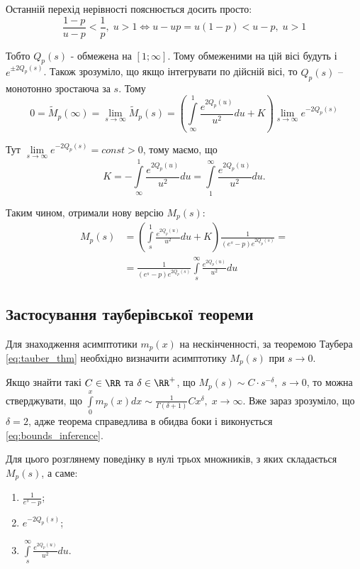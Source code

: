 Останній перехід нерівності пояснюється досить просто:
$$
\frac{1-p}{u - p} < \frac{1}{p}, \; u > 1 \Leftrightarrow u - u p = u(1-p) < u - p, \; u > 1
$$

Тобто $Q_p(s)$ - обмежена на $[1; \infty]$. Тому обмеженими на цій вісі будуть і $e^{\pm 2Q_p(s)}$. Також зрозуміло, що якщо інтегрувати по дійсній вісі, то $Q_p(s)$ – монотонно зростаюча за $s$. Тому
\begin{equation}
0 = \tilde M_p(\infty) = \lim_{s\rightarrow \infty} \tilde M_p(s) = \left( \int\limits_\infty^1 \frac{e^{2Q_p(u)}}{u^2} du + K \right) \lim_{s\rightarrow \infty} e^{- 2Q_p(s)}
\end{equation}

Тут $\lim\limits_{s\rightarrow \infty} e^{- 2Q_p(s)} = const > 0$, тому маємо, що
\begin{equation}
K = -  \int\limits_\infty^1 \frac{e^{2Q_p(u)}}{u^2} du =  \int\limits_1^\infty \frac{e^{2Q_p(u)}}{u^2} du.
\end{equation}

Таким чином, отримали нову версію $M_{p}(s)$:
\begin{equation}
\begin{split}
\label{eq:model_laplace_sol}
M_p(s)&= \left( \int\limits_s^1 \frac{e^{2Q_p(u)}}{u^2} du + K \right) \frac{1}{(e^s - p)  e^{2Q_p(s)}}
= \\
&=\frac{1}{(e^s - p)  e^{2Q_p(s)}} \int\limits_s^\infty \frac{e^{2Q_p(u)}}{u^2} du
\end{split}
\end{equation}

\subsection{Застосування тауберівської теореми}

Для знаходження асимптотики $m_p(x)$ на нескінченності, за теоремою Таубера \eqref{eq:tauber_thm} необхідно визначити асимптотику $M_p(s)$ при $s \rightarrow 0$.

Якщо знайти такі $C \in \RR$ та $\delta \in \RR^+$, що $M_p(s) \sim C \cdot s^{-\delta}, \; s \rightarrow 0$, то можна стверджувати, що $\int\limits_0^x m_p(x) dx \sim \frac{1}{\Gamma(\delta + 1)} C x^\delta, \; x \rightarrow \infty$. Вже зараз зрозуміло, що $\delta = 2$, адже теорема справедлива в обидва боки і виконується \eqref{eq:bounds_inference}.

Для цього розглянему поведінку в нулі трьох множників, з яких складається $M_p(s)$, а саме:
\begin{enumerate}
	\item $\displaystyle\frac{1}{e^s - p}$;
	\item $e^{-2Q_p(s)}$;
	\item $\displaystyle\int\limits_s^\infty \frac{e^{2Q_p(u)}}{u^2} du$.
\end{enumerate}

